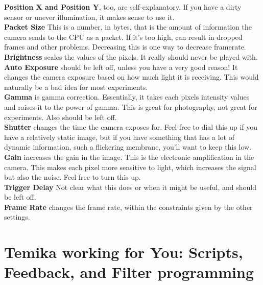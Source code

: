 \documentclass{report}
\begin{document}
\textbf{Position X and Position Y}, too, are self-explanatory. If you have a dirty sensor or unever illumination, it makes sense to use it.\\

\textbf{Packet Size} This is a number, in bytes, that is the amount of information the camera sends to the CPU as a packet. If it's too high, can result in dropped frames and other problems.   Decreasing this is one way to decrease framerate.\\

\textbf{Brightness} scales the values of the pixels. It really should never be played with.\\

\textbf{Auto Exposure} should be left off, unless you have a very good reason! It changes the camera exposure based on how much light it is receiving. This would naturally be a bad idea for most experiments.\\

\textbf{Gamma} is gamma correction. Essentially, it takes each pixels intensity values and raises it to the power of gamma. This is great for photography, not great for experiments. Also should be left off. \\

\textbf{Shutter} changes the time the camera exposes for. Feel free to dial this up if you have a relatively static image, but if you have something that has a lot of dynamic information, such a flickering membrane, you'll want to keep this low.\\

\textbf{Gain} increases the gain in the image. This is the electronic amplification in the camera.  This makes each pixel more sensitive to light, which increases the signal but also the noise. Feel free to turn this up.\\

\textbf{Trigger Delay}  Not clear what this does or when it might be useful, and should be left off.\\

\textbf{Frame Rate} changes the frame rate, within the constraints given by the other settings.\\







\newpage

\chapter{Temika working for You: Scripts, Feedback, and Filter programming}
\end{document}
